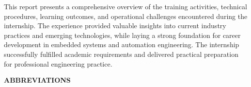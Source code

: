 \documentclass[12pt,a4paper]{report}
\begin{document}
\noindent This report presents a comprehensive overview of the training activities, technical procedures, learning outcomes, and operational challenges encountered during the internship. The experience provided valuable insights into current industry practices and emerging technologies, while laying a strong foundation for career development in embedded systems and automation engineering. The internship successfully fulfilled academic requirements and delivered practical preparation for professional engineering practice.

\newpage
\tableofcontents
\vspace{40pt}

\vspace{0.2cm}
\listoffigures
\vspace{-10pt}

\newpage

{\fontsize{14}{16.8}\selectfont\bfseries\centering ABBREVIATIONS\par}
\vspace{10pt}
\end{document}
